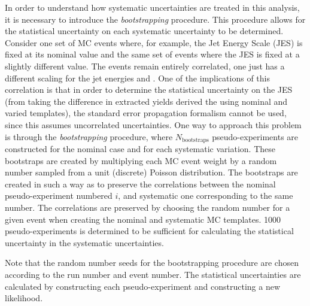 In order to understand how systematic uncertainties are treated in this analysis, it is necessary to introduce the \textit{bootstrapping} procedure. This procedure allows for the statistical uncertainty on each systematic uncertainty to be determined. Consider one set of MC events where, for example, the Jet Energy Scale (JES) is fixed at its nominal value and the same set of events where the JES is fixed at a slightly different value. The events remain entirely correlated, one just has a different scaling for the jet energies and \pt. One of the implications of this correlation is that in order to determine the statistical uncertainty on the JES (from taking the difference in extracted yields derived the using nominal and varied templates), the standard error propagation formalism cannot be used, since this assumes uncorrelated uncertainties. One way to approach this problem is through the \textit{bootstrapping} procedure, where $N_{\text{bootstraps}}$ pseudo-experiments are constructed for the nominal case and for each systematic variation. These bootstraps are created by multiplying each MC event weight by a random number sampled from a unit (discrete) Poisson distribution. The bootstraps are created in such a way as to preserve the correlations between the nominal pseudo-experiment numbered $i$, and systematic one corresponding to the same number. The correlations are preserved by choosing the random number for a given event when creating the nominal and systematic MC templates. 1000 pseudo-experiments is determined to be sufficient for calculating the statistical uncertainty in the systematic uncertainties.%

Note that the random number seeds for the bootstrapping procedure are chosen according to the run number and event number. The statistical uncertainties are calculated by constructing each pseudo-experiment and constructing a new likelihood. 

